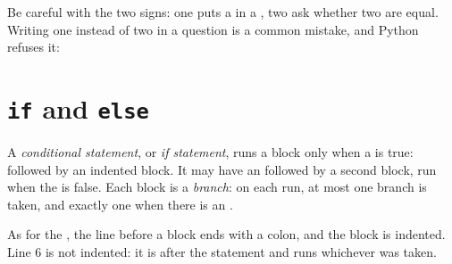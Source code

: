 Be careful with the two signs: one \code{=} puts a  in a , two
\code{==} ask whether two  are equal. Writing one instead of two in a
question is a common mistake, and Python refuses it:

\label{out:g6:if-else:assign}

\section{\texorpdfstring{\texttt{if}}{if} and \texorpdfstring{\texttt{else}}{else}}

\begin{definition}\label{def:g6:if-else:if}
A \emph{conditional statement}, or \emph{if
statement}, runs a block only when a  is true:
 followed by an indented block. It may have an
 followed by a second block, run when the  is false. Each
block is a \emph{branch}: on each run, at most one branch is
taken, and exactly one when there is an .
\end{definition}

\label{lst:g6:if-else:even-odd}

\label{out:g6:if-else:even-odd}

As for the  , the line before a block ends with a colon, and the
block is indented. Line 6 is not indented: it is after the  statement
and runs whichever  was taken.

